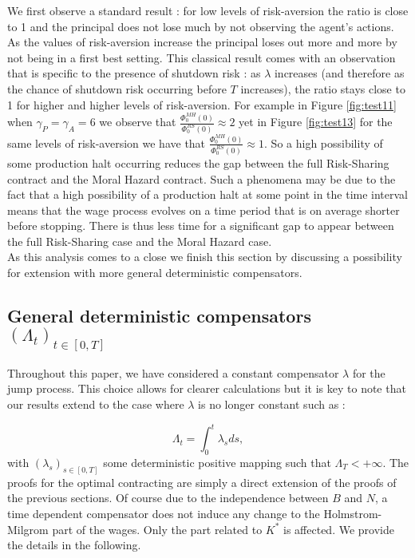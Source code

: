 \documentclass[numbook, envcountsect, envcountsame, envcountreset, runningheads, smallextended]{article}
\begin{document}
We first observe a standard result : for low levels of risk-aversion the ratio is close to 1 and the principal does not lose much by not observing the agent's actions. As the values of risk-aversion increase the principal loses out more and more by not being in a first best setting. This classical result comes with an observation that is specific to the presence of shutdown risk : as $\lambda$ increases (and therefore as the chance of shutdown risk occurring before $T$ increases), the ratio stays close to 1 for higher and higher levels of risk-aversion. For example in Figure \ref{fig:test11} when $\gamma_P=\gamma_A=6$ we observe that $ \frac{\Phi_0^{MH}(0)}{\Phi_0^{RS}(0)} \approx 2$ yet in Figure \ref{fig:test13} for the same levels of risk-aversion we have that  $ \frac{\Phi_0^{MH}(0)}{\Phi_0^{RS}(0)} \approx 1.$ So a high possibility of some production halt occurring reduces the gap between the full Risk-Sharing contract and the Moral Hazard contract. Such a phenomena may be due to the fact that a high possibility of a production halt at some point in the time interval means that the wage process evolves on a time period that is on average shorter before stopping. There is thus less time for a significant gap to appear between the full Risk-Sharing case and the Moral Hazard case. \\

As this analysis comes to a close we finish this section by discussing a possibility for extension with more general deterministic compensators.


\subsection{General deterministic compensators $(\Lambda_t)_{t \in [0,T]}$} \label{deterministicintensity}

Throughout this paper, we have considered a constant compensator $\lambda$ for the jump process. This choice allows for clearer calculations but it is key to note that our results extend to the case where $\lambda$ is no longer constant such as : 

$$ \Lambda_t = \int_0^t \lambda_s ds,$$
with $(\lambda_s)_{s \in [0,T]}$ some deterministic positive mapping such that $\Lambda_T<+\infty$. The proofs for the optimal contracting are simply a direct extension of the proofs of the previous sections. Of course due to the independence between $B$ and $N$, a time dependent compensator does not induce any change to the Holmstrom-Milgrom part of the wages. Only the part related to $K^*$ is affected. We provide the details in the following. \\
\end{document}

